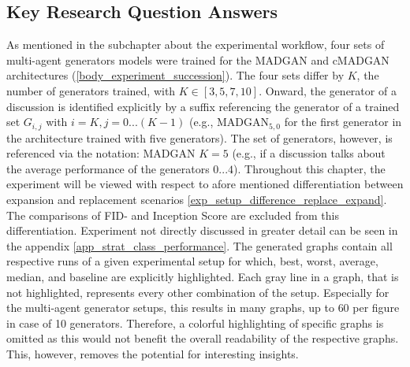 \subsection{Key Research Question Answers}
As mentioned in the subchapter about the experimental workflow, four sets of multi-agent generators models were trained  for the MADGAN and cMADGAN architectures (\ref{body_experiment_succession}). The four sets differ by \(K\), the number of generators trained, with \(K \in [3, 5, 7, 10]\). Onward, the generator of a discussion is identified explicitly by a suffix referencing the generator of a trained set \(G_{i, j}\) with \(i=K, j=0...(K-1)\) (e.g., \(\text{MADGAN}_{5, 0}\) for the first generator in the architecture trained with five generators). The set of generators, however, is referenced via the notation: MADGAN \(K=5\) (e.g., if a discussion talks about the average performance of the generators \(0...4\)). Throughout this chapter, the experiment will be viewed with respect to afore mentioned differentiation between expansion and replacement scenarios \ref{exp_setup_difference_replace_expand}. The comparisons of FID- and Inception Score are excluded from this differentiation. Experiment not directly discussed in greater detail can be seen in the appendix \ref{app_strat_class_performance}.
The generated graphs contain all respective runs of a given experimental setup for which, best, worst, average, median, and baseline are explicitly highlighted. Each gray line in a graph, that is not highlighted, represents every other combination of the setup. Especially for the multi-agent generator setups, this results in many graphs, up to $60$ per figure in case of 10 generators. Therefore, a colorful highlighting of specific graphs is omitted as this would not benefit the overall readability of the respective graphs. This, however, removes the potential for interesting insights.

\newpage
